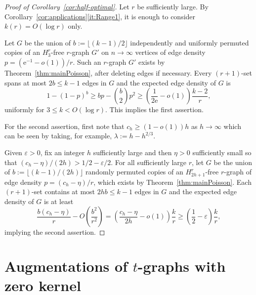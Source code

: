 \documentclass[10pt,a4paper]{article}
\numberwithin{equation}{section}
\theoremstyle{definition}
\theoremstyle{remark}
\newcommand{\hide}[1]{{\color{DarkGreen}#1}}
\renewcommand{\hide}[1]{}
\newcommand{\me}{\mathrm{e}}
\begin{document}
\begin{proof}[Proof of Corollary~\ref{cor:half-optimal}]
	Let $r$ be sufficiently large. By Corollary~\ref{cor:applications}\ref{it:Range1},
	it is enough to consider $k(r)=O(\log r)$ only.
	

	
Let $G$ be the union of $b:=\lfloor(k-1)/2\rfloor$ independently and uniformly permuted copies of an $H_3^r$-free $r$-graph $G'$ on $n\to\infty$ vertices of edge density $p=(\me^{-1}-o(1))/r$. Such an $r$-graph $G'$ exists by Theorem~\ref{thm:mainPoisson}, after deleting edges if necessary. Every $(r+1)$-set spans at most $2b\le k-1$ edges in $G$ and the expected edge density of $G$ is
	\[
	1-(1-p)^b\ge bp-\binom b2p^2
	\ge\left(\frac1{2\me}-o(1)\right)\frac{k-2}{r},
	\]
	uniformly for $3\le k<O(\log r)$. This implies the first assertion.
	
	For the second assertion, first note that $c_h\ge (1-o(1))h$ as $h\to\infty$ which can be seen by taking, for example, $\lambda:=h-h^{2/3}$. 
	\hide{The upper bound $c_h\le h$ follows from
	\[
	\lambda\mathbb P(Z\le h-1)
	=\mathbb E[Z\mathbf 1_{\{Z\le h\}}]\le h
	\quad\text{for }Z\sim\operatorname{Pois}(\lambda).
	\]

For the lower bound, let $\lambda:=h-h^{2/3}$. Chebyshev's inequality gives $\mathbb P(Z\ge h)\le\lambda/h^{4/3}\le h^{-1/3}$, so
	\[
	c_h\ge(h-h^{2/3})(1-h^{-1/3})=(1-o(1))h.
	\]
}
 Given $\varepsilon>0$, fix an integer $h$ sufficiently large and then $\eta>0$ sufficiently small so that $(c_h-\eta)/(2h)>1/2-\varepsilon/2$.
For all sufficiently large $r$, let $G$ be the union of  $b:=\lfloor(k-1)/(2h)\rfloor$ randomly permuted copies of an $H_{2h+1}^r$-free $r$-graph of edge density $p=(c_h-\eta)/r$, which exists by Theorem~\ref{thm:mainPoisson}. Each $(r+1)$-set contains at most $2hb\le k-1$ edges in $G$ and the expected edge density of $G$ is at least
	\[
	\frac{b(c_h-\eta)}r-O\left(\frac{b^2}{r^2}\right)
	=\left(\frac{c_h-\eta}{2h}-o(1)\right)\frac{k}{r}\ge \left(\frac12-\varepsilon\right)\frac{k}{r},
	\]
	implying the second assertion.
\end{proof}



\section{Augmentations of \texorpdfstring{$t$}{t}-graphs with zero kernel}\label{sec:2}
\end{document}
